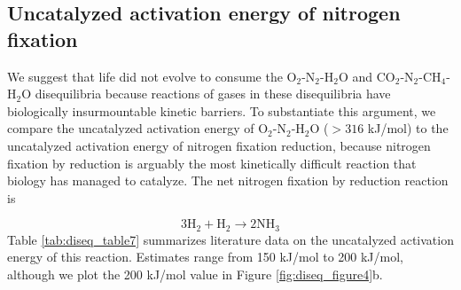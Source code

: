 \subsection{Uncatalyzed activation energy of nitrogen fixation} \label{sec:diseq_c}

We suggest that life did not evolve to consume the O$_2$-N$_2$-H$_2$O and CO$_2$-N$_2$-CH$_4$-H$_2$O disequilibria because reactions of gases in these disequilibria have biologically insurmountable kinetic barriers. To substantiate this argument, we compare the uncatalyzed activation energy of O$_2$-N$_2$-H$_2$O ($>316$ kJ/mol) to the uncatalyzed activation energy of nitrogen fixation reduction, because nitrogen fixation by reduction is arguably the most kinetically difficult reaction that biology has managed to catalyze. The net nitrogen fixation by reduction reaction is

\begin{equation}
  3 \mathrm{H_2} + \mathrm{H_2} \rightarrow 2 \mathrm{NH_3}
\end{equation}
Table \ref{tab:diseq_table7} summarizes literature data on the uncatalyzed activation energy of this reaction. Estimates range from 150 kJ/mol to 200 kJ/mol, although we plot the 200 kJ/mol value in Figure \ref{fig:diseq_figure4}b. 

